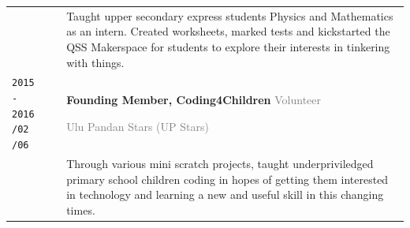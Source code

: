 \documentclass[11pt]{article}
\newcommand{\monoSp}[1]{{\usefont{T1}{rbtm}{m}{n} #1}}
\newcommand{\code}[1]{\monoSp{#1}}
\begin{document}
{\begin{tabularx}{\textwidth}{@{}l p{0.20cm} X @{}}
		& & {\small Taught upper secondary express students Physics and Mathematics as an intern. Created worksheets, marked tests and kickstarted the QSS Makerspace for students to explore their interests in tinkering with things.} \\
		\makecell{\texttt{\large 2015 - 2016} \vspace{-1mm} \\ \texttt{\footnotesize /02} \hspace{1.5em} \texttt{\footnotesize /06}} & & \textbf{Founding Member, Coding4Children} \hfill \textcolor{gray}{Volunteer} \par \textcolor{gray}{Ulu Pandan Stars {\footnotesize (UP Stars)}}\\[-0.5em]
		& & {\small Through various mini \code{scratch} projects, taught underpriviledged primary school children coding in hopes of getting them interested in technology and learning a new and useful skill in this changing times. }
	\end{tabularx}
}
\end{document}
